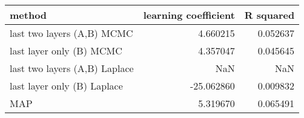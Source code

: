 \begin{tabular}{lrr}
\toprule
                        method &  learning coefficient &  R squared \\
\midrule
    last two layers (A,B) MCMC &              4.660215 &   0.052637 \\
      last layer only (B) MCMC &              4.357047 &   0.045645 \\
 last two layers (A,B) Laplace &                   NaN &        NaN \\
   last layer only (B) Laplace &            -25.062860 &   0.009832 \\
                           MAP &              5.319670 &   0.065491 \\
\bottomrule
\end{tabular}
